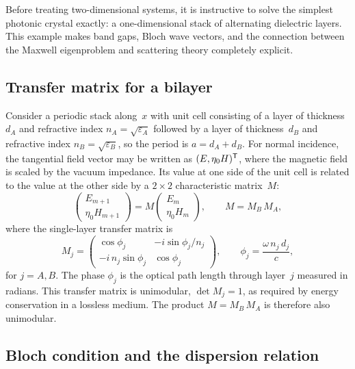 Before treating two-dimensional systems, it is instructive to solve the
simplest photonic crystal exactly: a one-dimensional stack of alternating
dielectric layers. This example makes band gaps, Bloch wave vectors, and
the connection between the Maxwell eigenproblem and scattering theory
completely explicit.

\subsection{Transfer matrix for a bilayer}
\label{ssec:bilayer-transfer-ch3}

Consider a periodic stack along~$x$ with unit cell consisting of a layer
of thickness~$d_A$ and refractive index $n_A = \sqrt{\varepsilon_A}$
followed by a layer of thickness~$d_B$ and refractive index
$n_B = \sqrt{\varepsilon_B}$, so the period is $a = d_A + d_B$.
For normal incidence, the tangential field vector may be written as
$(E,\eta_0 H)^{\mathsf{T}}$, where the magnetic field is scaled by the
vacuum impedance. Its value at one side of the unit cell is related to
the value at the other side by a $2\times 2$ characteristic matrix~$M$:
\begin{equation}
 \begin{pmatrix} E_{m+1} \\ \eta_0 H_{m+1} \end{pmatrix}
 = M \begin{pmatrix} E_m \\ \eta_0 H_m \end{pmatrix},
 \qquad
 M = M_B \, M_A,
 \label{eq:1d-transfer}
\end{equation}
where the single-layer transfer matrix is
\begin{equation}
 M_j = \begin{pmatrix}
 \cos\phi_j & -i\sin\phi_j / n_j \\
 -i\,n_j\sin\phi_j & \cos\phi_j
 \end{pmatrix},
 \qquad
 \phi_j = \frac{\omega\,n_j\,d_j}{c},
 \label{eq:single-layer-transfer}
\end{equation}
for $j = A, B$. The phase $\phi_j$ is the optical path length through
layer~$j$ measured in radians. This transfer matrix is unimodular,
$\det M_j = 1$, as required by energy conservation in a lossless medium.
The product $M = M_B\,M_A$ is therefore also unimodular.

\subsection{Bloch condition and the dispersion relation}
\label{ssec:1d-dispersion}

